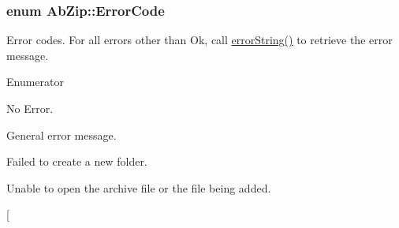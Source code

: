 \subsubsection[{\texorpdfstring{Error\+Code}{ErrorCode}}]{\setlength{\rightskip}{0pt plus 5cm}enum {\bf Ab\+Zip\+::\+Error\+Code}}\hypertarget{class_ab_zip_ac669c2fce0fbde75677d12711c11c504}{}\label{class_ab_zip_ac669c2fce0fbde75677d12711c11c504}


Error codes. For all errors other than Ok, call \hyperlink{class_ab_zip_a218ae44456c9e7518ad22fb9f8fd7466}{error\+String()} to retrieve the error message. 

\begin{Desc}
\item[Enumerator]\par
\begin{description}
\item[{\em 
Ok\hypertarget{class_ab_zip_ac669c2fce0fbde75677d12711c11c504a897b2aeaa63e2e2be4464b795017c971}{}\label{class_ab_zip_ac669c2fce0fbde75677d12711c11c504a897b2aeaa63e2e2be4464b795017c971}
}]No Error. \item[{\em 
General\+Error\hypertarget{class_ab_zip_ac669c2fce0fbde75677d12711c11c504a5c47b45f7cef73c6e14a9e5e7d2108b6}{}\label{class_ab_zip_ac669c2fce0fbde75677d12711c11c504a5c47b45f7cef73c6e14a9e5e7d2108b6}
}]General error message. \item[{\em 
Create\+Dir\+Error\hypertarget{class_ab_zip_ac669c2fce0fbde75677d12711c11c504ad2e454eab3290b12e6a0dd81374d6cc7}{}\label{class_ab_zip_ac669c2fce0fbde75677d12711c11c504ad2e454eab3290b12e6a0dd81374d6cc7}
}]Failed to create a new folder. \item[{\em 
Open\+File\+Error\hypertarget{class_ab_zip_ac669c2fce0fbde75677d12711c11c504a0d8a3def87960152f44da3aea842e99f}{}\label{class_ab_zip_ac669c2fce0fbde75677d12711c11c504a0d8a3def87960152f44da3aea842e99f}
}]Unable to open the archive file or the file being added. \item[{\em 
}
\end{description}
\end{Desc}
